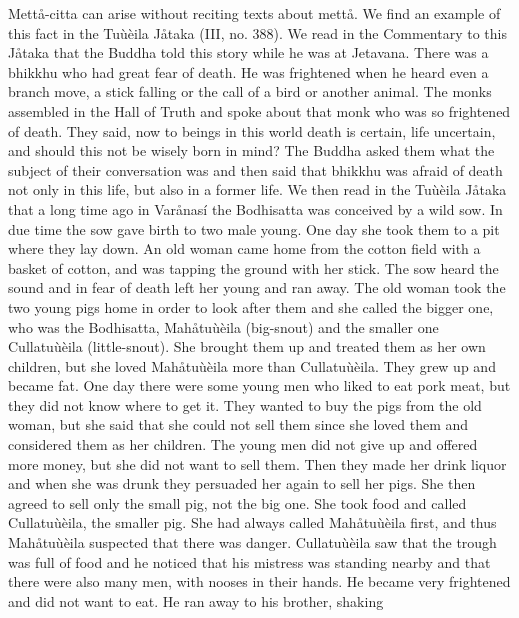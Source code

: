 \documentclass[12pt,twoside]{article}
\begin{document}
Mett{\aa}{}-citta can arise without reciting texts about mett{\aa}. We
find an example of this fact in the
{\textasciigrave}{\textasciigrave}Tu\`u\`eila
J{\aa}taka{\textquotesingle}{\textquotesingle} (III, no. 388). We read
in the Commentary to this J{\aa}taka that the Buddha told this story
while he was at Jetavana. There was a bhikkhu who had great fear of
death. He was frightened when he heard even a branch move, a stick
falling or the call of a bird or another animal. The monks assembled in
the Hall of Truth and spoke about that monk who was so frightened of
death. They said, {\textasciigrave}{\textasciigrave}now to beings in
this world death is certain, life uncertain, and should this not be
wisely born in mind?{\textquotesingle}{\textquotesingle} The Buddha
asked them what the subject of their conversation was and then said
that bhikkhu was afraid of death not only in this life, but also in a
former life. We then read in the Tu\`u\`eila J{\aa}taka that a long
time ago in Var{\aa}nas\'i the Bodhisatta was conceived by a wild sow.
In due time the sow gave birth to two male young. One day she took them
to a pit where they lay down. An old woman came home from the cotton
field with a basket of cotton, and was tapping the ground with her
stick. The sow heard the sound and in fear of death left her young and
ran away. The old woman took the two young pigs home in order to look
after them and she called the bigger one, who was the Bodhisatta,
Mah{\aa}tu\`u\`eila (big{}-snout) and the smaller one Cullatu\`u\`eila
(little{}-snout). She brought them up and treated them as her own
children, but she loved Mah{\aa}tu\`u\`eila more than Cullatu\`u\`eila.
They grew up and became fat. One day there were some young men who
liked to eat pork meat, but they did not know where to get it. They
wanted to buy the pigs from the old woman, but she said that she could
not sell them since she loved them and considered them as her children.
The young men did not give up and offered more money, but she did not
want to sell them. Then they made her drink liquor and when she was
drunk they persuaded her again to sell her pigs. She then agreed to
sell only the small pig, not the big one. She took food and called
Cullatu\`u\`eila, the smaller pig. She had always called
Mah{\aa}tu\`u\`eila first, and thus Mah{\aa}tu\`u\`eila suspected that
there was danger. Cullatu\`u\`eila saw that the trough was full of food
and he noticed that his mistress was standing nearby and that there
were also many men, with nooses in their hands. He became very
frightened and did not want to eat. He ran away to his brother, shaking
\end{document}
